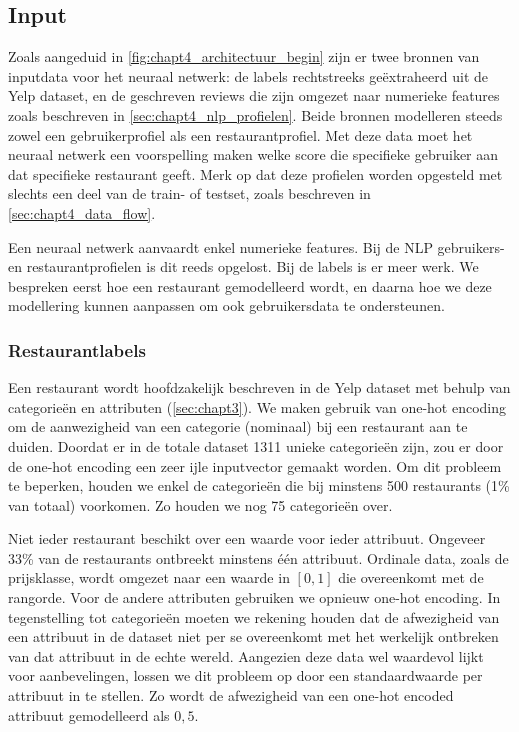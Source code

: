 \subsection{Input}
\label{sec:chapt4_nn_input}
Zoals aangeduid in \autoref{fig:chapt4_architectuur_begin} zijn er twee bronnen van inputdata voor het neuraal netwerk: de labels rechtstreeks geëxtraheerd uit de Yelp dataset, en de geschreven reviews die zijn omgezet naar numerieke features zoals beschreven in \autoref{sec:chapt4_nlp_profielen}. Beide bronnen modelleren steeds zowel een gebruikerprofiel als een restaurantprofiel. Met deze data moet het neuraal netwerk een voorspelling maken welke score die specifieke gebruiker aan dat specifieke restaurant geeft. Merk op dat deze profielen worden opgesteld met slechts een deel van de train- of testset, zoals beschreven in \autoref{sec:chapt4_data_flow}.

Een neuraal netwerk aanvaardt enkel numerieke features. Bij de NLP gebruikers- en restaurantprofielen is dit reeds opgelost. Bij de labels is er meer werk. We bespreken eerst hoe een restaurant gemodelleerd wordt, en daarna hoe we deze modellering kunnen aanpassen om ook gebruikersdata te ondersteunen.

\subsubsection{Restaurantlabels}
\label{sec:chapt4_nn_restaurantlabels}
Een restaurant wordt hoofdzakelijk beschreven in de Yelp dataset met behulp van categorieën en attributen (\autoref{sec:chapt3}). We maken gebruik van one-hot encoding om de aanwezigheid van een categorie (nominaal) bij een restaurant aan te duiden. Doordat er in de totale dataset 1311 unieke categorieën zijn, zou er door de one-hot encoding een zeer ijle inputvector gemaakt worden. Om dit probleem te beperken, houden we enkel de categorieën die bij minstens 500 restaurants (1\% van totaal) voorkomen. Zo houden we nog 75 categorieën over.

Niet ieder restaurant beschikt over een waarde voor ieder attribuut. Ongeveer 33\% van de restaurants ontbreekt minstens één attribuut. Ordinale data, zoals de prijsklasse, wordt omgezet naar een waarde in $[0, 1]$ die overeenkomt met de rangorde. Voor de andere attributen gebruiken we opnieuw one-hot encoding. In tegenstelling tot categorieën moeten we rekening houden dat de afwezigheid van een attribuut in de dataset niet per se overeenkomt met het werkelijk ontbreken van dat attribuut in de echte wereld. Aangezien deze data wel waardevol lijkt voor aanbevelingen, lossen we dit probleem op door een standaardwaarde per attribuut in te stellen. Zo wordt de afwezigheid van een one-hot encoded attribuut gemodelleerd als $0,5$.

